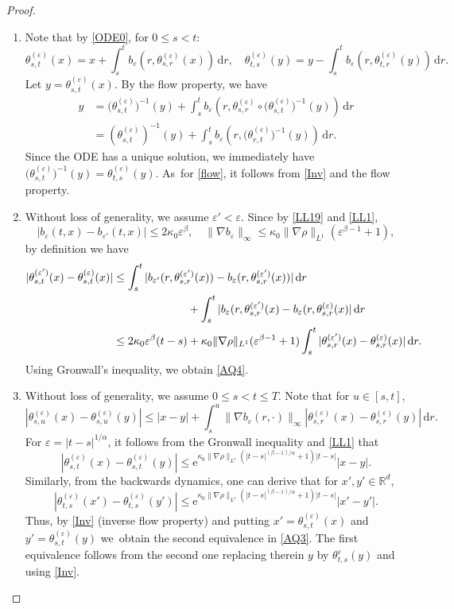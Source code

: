 \documentclass[JEP,XML,SOM,Unicode,published]{cedram}
\theoremstyle{plain}
\theoremstyle{definition}
\newcommand\e{\mathrm{e}}
\let\eps\varepsilon
\newcommand\mR{\mathbb{R}}
\newcommand\1{{\mathbf{1}}}
\newcommand{\dif}{\,\mathrm{d}}
\begin{document}
\begin{proof}
\begin{enumerate}
\item
Note that by \eqref{ODE0}, for $0\le s<t $:
\[
\theta_{s,t}^{(\eps)}(x)=x+\int^t_s{b_{\eps}}(r,\theta_{s,r}^{(\eps)}(x))\dif r,\quad \theta_{t,s}^{(\eps)}(y)=y-\int^t_s{b_{\eps}}(r,\theta_{t,r}^{(\eps)}(y))\dif r.
\]
Let $y=\theta_{s,t}^{(\eps)}(x)$. By the flow property, we have
\begin{align*}
y&=\bigl(\theta_{s,t}^{(\eps)}\bigr)^{-1}(y)+\int^t_s{b_{\eps}}(r,\theta_{s,r}^{(\eps)}\circ\bigl(\theta_{s,t}^{(\eps)}\bigr)^{-1}(y))\dif r\\
&=(\theta_{s,t}^{(\eps)})^{-1}(y)+\int^t_s{b_{\eps}}(r,\bigl(\theta_{r,t}^{(\eps)}\bigr)^{-1}(y))\dif r.
\end{align*}
Since the ODE has a unique solution, we immediately have $\bigl(\theta_{s,t}^{(\eps)}\bigr)^{-1}(y)=\theta_{t,s}^{(\eps)}(y)$. As~for \eqref{flow}, it follows from \eqref{Inv}
and the flow property.

\item
Without loss of generality, we assume $\eps'<\eps$. Since by \eqref{LL19} and \eqref{LL1},
\begin{equation}\label{LL2}
|b_\eps(t,x)-b_{\eps'}(t,x)|\leq 2\kappa_0\eps^\beta,\quad \|\nabla b_\eps\|_\infty\leq \kappa_0\|\nabla\rho\|_{L^1}(\eps^{\beta-1}+1),
\end{equation}
by definition we have
\begin{align*}
|\theta^{(\eps')}_{s,t}(x)-\theta^{(\eps)}_{s,t}(x)|
&\leq\int^t_s |b_{\eps'}(r,\theta^{(\eps')}_{s,r}(x))-b_{\eps}(r,\theta^{(\eps')}_{s,r}(x))|\dif r
\\&\hspace*{2.35cm}+\int^t_s |b_{\eps}(r,\theta^{(\eps')}_{s,r}(x)-b_{\eps}(r,\theta^{(\eps)}_{s,r}(x)|\dif r
\\&\leq 2\kappa_0\eps^\beta(t-s)+\kappa_0\|\nabla\rho\|_{L^1}(\eps^{\beta-1}+1)\int^t_s |\theta^{(\eps')}_{s,r}(x)-\theta^{(\eps)}_{s,r}(x)|\dif r.
\end{align*}
Using Gronwall's inequality, we obtain \eqref{AQ4}.

\item
Without loss of generality, we assume $0\leq s<t\leq T$.
Note that for $u\in[s,t]$,
\[
|\theta^{(\eps)}_{s,u}(x)-\theta^{(\eps)}_{s,u}(y)|\leq |x-y|+\int^u_s\|\nabla b_\eps(r,\cdot)\|_\infty|\theta^{(\eps)}_{s,r}(x)-\theta^{(\eps)}_{s,r}(y)|\dif r.
\]
For $\eps=|t-s|^{1/\alpha}$, it follows from the Gronwall inequality and \eqref{LL1} that
\[
|\theta^{(\eps)}_{s,t}(x)-\theta^{(\eps)}_{s,t}(y)|\leq \e^{\kappa_0\|\nabla\rho\|_{L^1}(|t-s|^{(\beta-1)/\alpha}+1)|t-s|}|x-y|.
\]
Similarly, from the backwards dynamics, one can derive that for {$x',y'\in \mR^d $,
\[
|\theta^{(\eps)}_{t,s}({x'})-\theta^{(\eps)}_{t,s}({y'})|\leq \e^{\kappa_0\|\nabla\rho\|_{L^1}(|t-s|^{(\beta-1)/\alpha}+1)|t-s|}|{x'-y'}|.
\]
Thus, by \eqref{Inv} {(inverse flow property)} and putting $x'=\theta^{(\eps)}_{{s,t}}(x)$ and $y'=\theta^{(\eps)}_{{s,t}}(y)$ we~obtain the second equivalence in \eqref{AQ3}.
The first equivalence follows from the second one replacing therein $y $ by $\theta_{t,s}^{\eps}(y) $ and using \eqref{Inv}}.\qedhere
\end{enumerate}
\end{proof}
\end{document}
